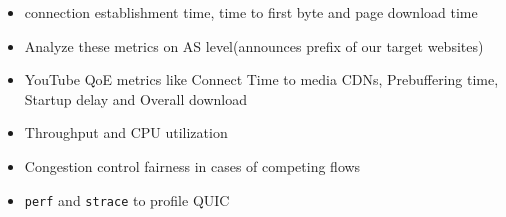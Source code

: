 \begin{frame}
    \begin{itemize}
    \itemsep3em 

    \item connection establishment time, time to first byte and page download time %

    \item Analyze these metrics on AS level(announces prefix of our target websites) %

    \item YouTube QoE metrics like Connect Time to media CDNs, Prebuffering time, Startup delay and Overall download %

    \item Throughput and  CPU utilization %

    \item Congestion control fairness in cases of competing flows
    \item \texttt{perf} and \texttt{strace} to profile QUIC
\end{itemize}
 
\end{frame}
\clearpage

